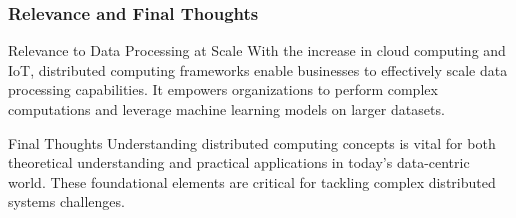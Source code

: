 \documentclass[aspectratio=169]{beamer}
\begin{document}
\begin{frame}[fragile]
  \frametitle{Relevance and Final Thoughts}
  \begin{block}{Relevance to Data Processing at Scale}
    With the increase in cloud computing and IoT, distributed computing frameworks enable businesses to effectively scale data processing capabilities. 
    It empowers organizations to perform complex computations and leverage machine learning models on larger datasets.
  \end{block}
  
  \begin{block}{Final Thoughts}
    Understanding distributed computing concepts is vital for both theoretical understanding and practical applications in today’s data-centric world. 
    These foundational elements are critical for tackling complex distributed systems challenges.
  \end{block}
\end{frame}
\end{document}
